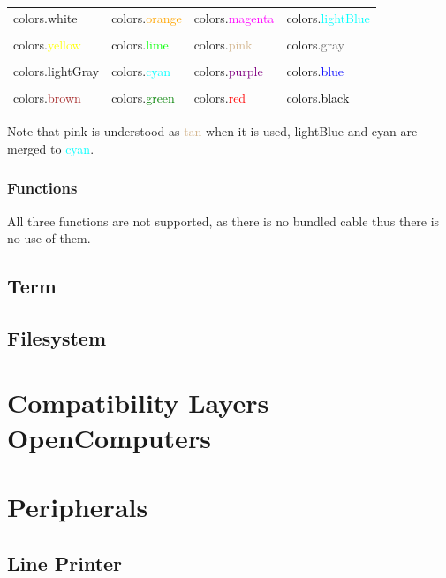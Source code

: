 \documentclass[10pt, stock]{memoir}
\let\oldsection\section
\renewcommand\section{\clearpage\oldsection}
\begin{document}
\begin{tabularx}{\textwidth}{l l l l}
	colors.white & colors.\textcolor{orange}{orange} & colors.\textcolor{magenta}{magenta} & colors.\textcolor{cyan}{lightBlue}
	\\ \\
	colors.\textcolor{yellow}{yellow} & colors.\textcolor{lime}{lime} & colors.\textcolor{tan}{pink} & colors.\textcolor{dimgrey}{gray}
	\\ \\
	colors.\textcolor{brightgrey}{lightGray} & colors.\textcolor{cyan}{cyan} & colors.\textcolor{purple}{purple} & colors.\textcolor{blue}{blue}
	\\ \\
	colors.\textcolor{brown}{brown} & colors.\textcolor{green}{green} & colors.\textcolor{red}{red} & colors.\textcolor{black}{black}
\end{tabularx}

Note that pink is understood as \textcolor{tan}{tan} when it is used, lightBlue and cyan are merged to \textcolor{cyan}{cyan}.

\subsection{Functions}

All three functions are not supported, as there is no bundled cable thus there is no use of them.

\section{Term}

\section{Filesystem}

\chapter[Compatibility Layers---OpenComputers]{{\LARGE Compatibility Layers} \\ OpenComputers}



\chapter{Peripherals}

\section{Line Printer}
\end{document}
